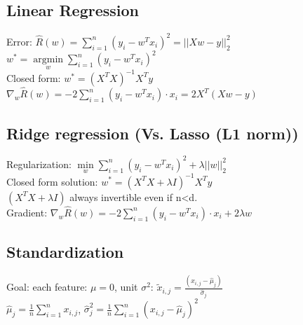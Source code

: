 \subsection*{Linear Regression}
Error: $\hat{R}(w) = \sum_{i=1}^n (y_i - w^Tx_i)^2 = ||Xw-y||^2_2$\\
$w^* = \underset{w}{\operatorname{argmin}} \sum_{i=1}^n (y_i - w^Tx_i)^2$\\
Closed form: $w^*=(X^T X)^{-1} X^T y$\\
$\nabla_w \hat{R}(w) = -2 \sum_{i=1}^n (y_i-w^T x_i) \cdot x_i = 2X^T (Xw-y)$

\subsection*{Ridge regression (Vs. Lasso (L1 norm))}
Regularization: $\underset{w}{\operatorname{min}} \sum \limits_{i=1}^n (y_i - w^Tx_i)^2 + \lambda ||w||_2^2$\\
Closed form solution: $w^*=(X^T X + \lambda I)^{-1} X^T y$\\
$(X^T X + \lambda I)$ always invertible even if n<d.\\
Gradient: $\nabla_w \hat{R}(w) = -2 \sum \limits_{i=1}^n (y_i-w^T x_i) \cdot x_i + 2 \lambda w$


\subsection*{Standardization}
Goal: each feature: $\mu = 0$, unit $\sigma^2$: $\tilde{x}_{i,j} = \frac{(x_{i,j}-\hat{\mu}_j)}{\hat{\sigma}_j}$\\
$\hat{\mu}_j = \frac{1}{n}\sum_{i=1}^n x_{i,j}$, $\hat{\sigma}_j^2 = \frac{1}{n}\sum_{i=1}^n {(x_{i,j}-\hat{\mu}_j)}^2$ 






